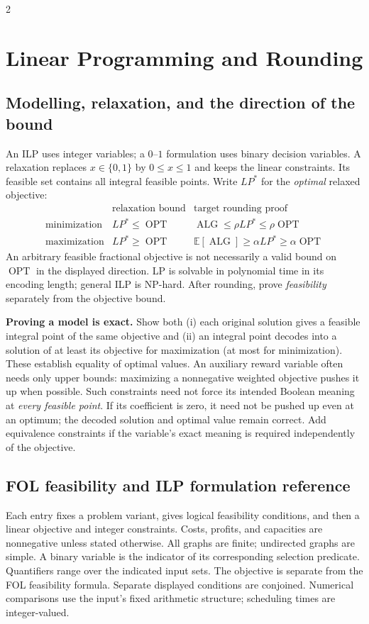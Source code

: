 \documentclass[8pt]{extarticle}
\theoremstyle{definition}
\newcommand{\OPT}{\operatorname{OPT}}
\newcommand{\ALG}{\operatorname{ALG}}
\begin{document}
\begin{multicols*}{2}
\section{Linear Programming and Rounding}\label{lp:main}

\subsection{Modelling, relaxation, and the direction of the bound}\label{lp:template}
An ILP uses integer variables; a $0$--$1$ formulation uses binary decision
variables. A relaxation replaces $x\in\{0,1\}$ by $0\le x\le1$ and keeps
the linear constraints. Its feasible set contains all integral feasible
points. Write $LP^*$ for the \emph{optimal} relaxed objective:
\[
  \begin{array}{c|c|c}
    &\text{relaxation bound}&\text{target rounding proof}\\\hline
    \text{minimization}&LP^*\le\OPT&\ALG\le\rho LP^*\le\rho\OPT\\
    \text{maximization}&LP^*\ge\OPT&
       \mathbb E[\ALG]\ge\alpha LP^*\ge\alpha\OPT
  \end{array}
\]
An arbitrary feasible fractional objective is not necessarily a valid bound
on $\OPT$ in the displayed direction. LP is solvable in polynomial time in
its encoding length; general ILP is NP-hard. After rounding, prove
\emph{feasibility} separately from the objective bound.

\textbf{Proving a model is exact.}
Show both (i) each original solution gives a feasible integral point of the
same objective and (ii) an integral point decodes into a solution of at least
its objective for maximization (at most for minimization). These establish
equality of optimal values. An auxiliary reward variable often needs only
upper bounds: maximizing a nonnegative weighted objective pushes it up when
possible. Such constraints need not force its intended Boolean meaning at
\emph{every feasible point}. If its coefficient is zero, it need not be
pushed up even at an optimum; the decoded solution and optimal value remain
correct. Add equivalence constraints if the variable's exact meaning is
required independently of the objective.

\subsection{FOL feasibility and ILP formulation reference}\label{lp:catalog}
Each entry fixes a problem variant, gives logical feasibility conditions,
and then a linear objective and integer constraints. Costs, profits, and
capacities are nonnegative unless stated otherwise. All graphs are finite;
undirected graphs are simple. A binary variable is the indicator of its
corresponding selection predicate. Quantifiers range over the indicated
input sets. The objective is separate from the FOL feasibility formula.
Separate displayed conditions are conjoined. Numerical comparisons use
the input's fixed arithmetic structure; scheduling times are integer-valued.


\end{multicols*}
\end{document}
